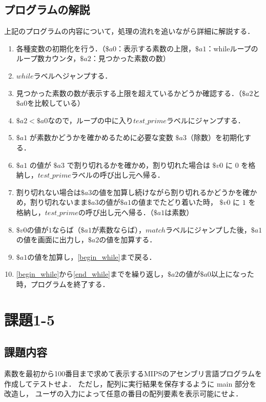 \documentclass[a4j,11pt]{jarticle}
\begin{document}
\subsection{プログラムの解説}
上記のプログラムの内容について，処理の流れを追いながら詳細に解説する．

\begin{enumerate}
      \item 各種変数の初期化を行う．（$\$a0$：表示する素数の上限，$\$a1$：whileループのループ数カウンタ，$\$a2$：見つかった素数の数）
      \item $while$ラベルへジャンプする．
      \item \label{begin_while}見つかった素数の数が表示する上限を超えているかどうか確認する．（$\$a2$と$\$a0$を比較している）
      \item $\$a2 < \$a0$なので，ループの中に入り$test\_prime$ラベルにジャンプする．
      \item $\$a1$ が素数かどうかを確かめるために必要な変数 $\$a3$（除数）を初期化する．
      \item $\$a1$ の値が $\$a3$ で割り切れるかを確かめ，割り切れた場合は $\$v0$ に $0$ を格納し，$test\_prime$ラベルの呼び出し元へ帰る．
      \item 割り切れない場合は$\$a3$の値を加算し続けながら割り切れるかどうかを確かめ，割り切れないまま$\$a3$の値が$\$a1$の値までたどり着いた時，
      $\$v0$ に $1$ を格納し，$test\_prime$の呼び出し元へ帰る．（$\$a1$は素数）
      \item $\$v0$の値が$1$ならば（$\$a1$が素数ならば），$match$ラベルにジャンプした後，$\$a1$の値を画面に出力し，$\$a2$の値を加算する．
      \item \label{end_while}$\$a1$の値を加算し，\ref{begin_while}まで戻る．
      \item \ref{begin_while}から\ref{end_while}までを繰り返し，$\$a2$の値が$\$a0$以上になった時，プログラムを終了する．
\end{enumerate}
\section{課題1-5}

\subsection{課題内容}

素数を最初から100番目まで求めて表示するMIPSのアセンブリ言語プログラムを作成してテストせよ． 
ただし，配列に実行結果を保存するように main 部分を改造し， 
ユーザの入力によって任意の番目の配列要素を表示可能にせよ．
\end{document}
